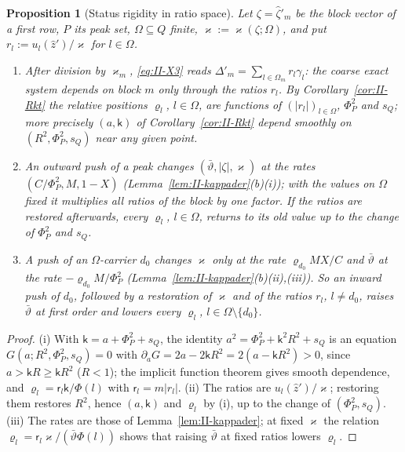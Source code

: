\documentclass[10pt]{amsart}
\newtheorem{proposition}[theorem]{Proposition}
\theoremstyle{definition}
\theoremstyle{remark}
\newcommand{\zh}{\hat z}
\begin{document}
\begin{proposition}[Status rigidity in ratio space]\label{prop:II-Rkt}
Let $\zeta=\hat\zeta'_m$ be the block vector of a first row, $P$ its peak set,
$\Omega\subseteq Q$ finite, $\varkappa:=\varkappa(\zeta;\Omega)$, and put
$r_l:=u_l(\zh')/\varkappa$ for $l\in\Omega$.
\begin{enumerate}
\item[(i)] After division by $\varkappa_m$, \eqref{eq:II-X3} reads $\Delta'_m=
\sum_{l\in\Omega_m}r_l\gamma_l$: the coarse exact system depends on block $m$ only
through the ratios $r_l$.  By Corollary~\textup{\ref{cor:II-Rkt}} the relative
positions $\varrho_l$, $l\in\Omega$, are functions of $(|r_l|)_{l\in\Omega}$, $\Phi_P^2$
and $s_Q$; more precisely $(a,\mathsf k)$ of Corollary~\textup{\ref{cor:II-Rkt}}
depend smoothly on $(R^2,\Phi_P^2,s_Q)$ near any given point.
\item[(ii)] An outward push of a peak changes $(\bar\vartheta,|\zeta|,\varkappa)$ at the
rates $(C/\Phi_P^2,M,1-X)$ \textup{(}Lemma~\textup{\ref{lem:II-kappader}(b)(i))}; with
the values on $\Omega$ fixed it multiplies all ratios of the block by one
factor.  If the ratios are restored afterwards, every $\varrho_l$, $l\in\Omega$,
returns to its old value up to the change of $\Phi_P^2$ and $s_Q$.
\item[(iii)] A push of an $\Omega$-carrier $d_0$ changes $\varkappa$ only at the rate
$\varrho_{d_0}MX/C$ and $\bar\vartheta$ at the rate $-\varrho_{d_0}M/\Phi_P^2$
\textup{(}Lemma~\textup{\ref{lem:II-kappader}(b)(ii),(iii))}.  So an inward push of
$d_0$, followed by a restoration of $\varkappa$ and of the ratios $r_l$, $l\ne d_0$,
raises $\bar\vartheta$ at first order and lowers every $\varrho_l$, $l\in\Omega\setminus
\{d_0\}$.
\end{enumerate}
\end{proposition}

\begin{proof}
(i) With $\mathsf k=a+\Phi_P^2+s_Q$, the identity $a^2=\Phi_P^2+\mathsf k^2R^2+s_Q$ is
an equation $G(a;R^2,\Phi_P^2,s_Q)=0$ with $\partial_aG=2a-2\mathsf kR^2=2(a-\mathsf k
R^2)>0$, since $a>\mathsf kR\ge\mathsf kR^2$ ($R<1$); the implicit function theorem
gives smooth dependence, and $\varrho_l=\mathsf r_l\mathsf k/\Phi(l)$ with $\mathsf r_l=
m|r_l|$.  (ii) The ratios are $u_l(\zh')/\varkappa$; restoring them restores $R^2$,
hence $(a,\mathsf k)$ and $\varrho_l$ by (i), up to the change of $(\Phi_P^2,s_Q)$.
(iii) The rates are those of Lemma~\ref{lem:II-kappader}; at fixed $\varkappa$ the
relation $\varrho_l=\mathsf r_l\varkappa/(\bar\vartheta\Phi(l))$ shows that raising
$\bar\vartheta$ at fixed ratios lowers $\varrho_l$.
\end{proof}
\end{document}

